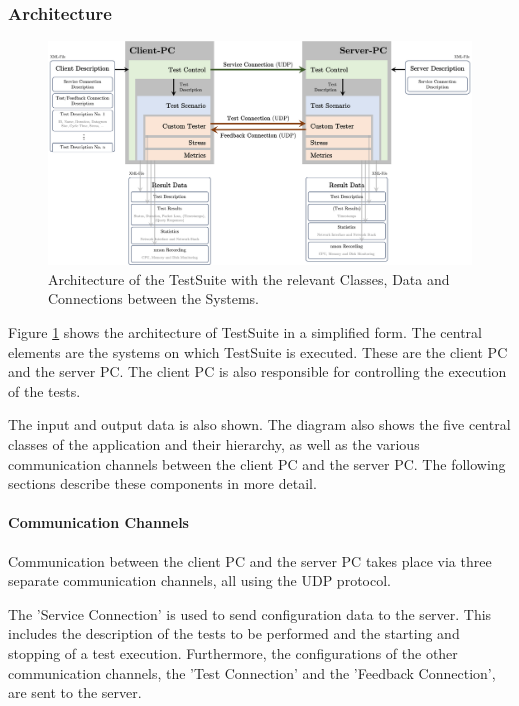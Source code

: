 \subsubsection{Architecture}

\begin{figure}
    \centering
    \includegraphics[width=1\linewidth]{figures/method/swdesign2.png}
    \caption[Architecture of the TestSuite with the relevant Classes, Data and Connections between the Systems]{Architecture of the TestSuite with the relevant Classes, Data and Connections between the Systems.}
    \label{fig:tsarch}
\end{figure}

Figure \ref{fig:tsarch} shows the architecture of TestSuite in a simplified form. The central elements are the systems on which TestSuite is executed. These are the client PC and the server PC. The client PC is also responsible for controlling the execution of the tests.

The input and output data is also shown. The diagram also shows the five central classes of the application and their hierarchy, as well as the various communication channels between the client PC and the server PC. The following sections describe these components in more detail.

\paragraph{Communication Channels}
Communication between the client PC and the server PC takes place via three separate communication channels, all using the UDP protocol.

The 'Service Connection' is used to send configuration data to the server. This includes the description of the tests to be performed and the starting and stopping of a test execution. Furthermore, the configurations of the other communication channels, the 'Test Connection' and the 'Feedback Connection', are sent to the server.

